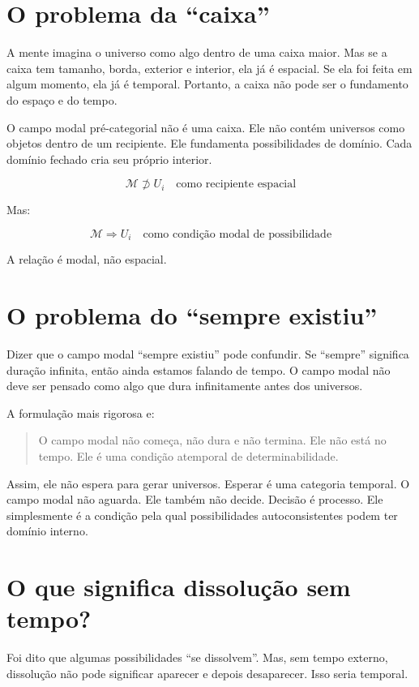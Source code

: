\documentclass[11pt,a4paper]{article}
\newcommand{\CMP}{\mathcal{M}}
\newcommand{\depends}{\Rightarrow}
\begin{document}
\section{O problema da ``caixa''}

A mente imagina o universo como algo dentro de uma caixa maior. Mas se a caixa tem tamanho, borda, exterior e interior, ela já é espacial. Se ela foi feita em algum momento, ela já é temporal. Portanto, a caixa não pode ser o fundamento do espaço e do tempo.

O campo modal pré-categorial não é uma caixa. Ele não contém universos como objetos dentro de um recipiente. Ele fundamenta possibilidades de domínio. Cada domínio fechado cria seu próprio interior.

\[
\CMP \not\supset U_i \quad \text{como recipiente espacial}
\]

Mas:

\[
\CMP \depends U_i \quad \text{como condição modal de possibilidade}
\]

A relação é modal, não espacial.

\section{O problema do ``sempre existiu''}

Dizer que o campo modal ``sempre existiu'' pode confundir. Se ``sempre'' significa duração infinita, então ainda estamos falando de tempo. O campo modal não deve ser pensado como algo que dura infinitamente antes dos universos.

A formulação mais rigorosa e:

\begin{quote}
O campo modal não começa, não dura e não termina. Ele não está no tempo. Ele é uma condição atemporal de determinabilidade.
\end{quote}

Assim, ele não espera para gerar universos. Esperar é uma categoria temporal. O campo modal não aguarda. Ele também não decide. Decisão é processo. Ele simplesmente é a condição pela qual possibilidades autoconsistentes podem ter domínio interno.

\section{O que significa dissolução sem tempo?}

Foi dito que algumas possibilidades ``se dissolvem''. Mas, sem tempo externo, dissolução não pode significar aparecer e depois desaparecer. Isso seria temporal.
\end{document}
